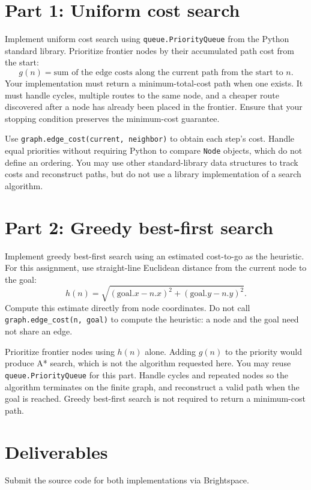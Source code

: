 \documentclass[11pt]{article}
\begin{document}
\newpage
\section*{Part 1: Uniform cost search}
Implement uniform cost search using \texttt{queue.PriorityQueue} from the
Python standard library. Prioritize frontier nodes by their accumulated path
cost from the start:
\[
  g(n)=\text{sum of the edge costs along the current path from the start to }n.
\]
Your implementation must return a minimum-total-cost path when one exists.
It must handle cycles, multiple routes to the same node, and a cheaper route
discovered after a node has already been placed in the frontier. Ensure that
your stopping condition preserves the minimum-cost guarantee.

Use \texttt{graph.edge\_cost(current, neighbor)} to obtain each step's cost.
Handle equal priorities without requiring Python to compare \texttt{Node}
objects, which do not define an ordering. You may use other standard-library
data structures to track costs and reconstruct paths, but do not use a
library implementation of a search algorithm.

\section*{Part 2: Greedy best-first search}
Implement greedy best-first search using an estimated cost-to-go as the
heuristic. For this assignment, use straight-line Euclidean distance from
the current node to the goal:
\[
  h(n)=\sqrt{(\mathrm{goal}.x-n.x)^2+(\mathrm{goal}.y-n.y)^2}.
\]
Compute this estimate directly from node coordinates. Do not call
\texttt{graph.edge\_cost(n, goal)} to compute the heuristic: a node and the
goal need not share an edge.

Prioritize frontier nodes using \(h(n)\) alone. Adding \(g(n)\) to the priority
would produce A* search, which is not the algorithm requested here. You may
reuse \texttt{queue.PriorityQueue} for this part. Handle cycles and repeated
nodes so the algorithm terminates on the finite graph, and reconstruct a
valid path when the goal is reached. Greedy best-first search is not required
to return a minimum-cost path.

\section*{Deliverables}
Submit the source code for both implementations via Brightspace.
\end{document}
